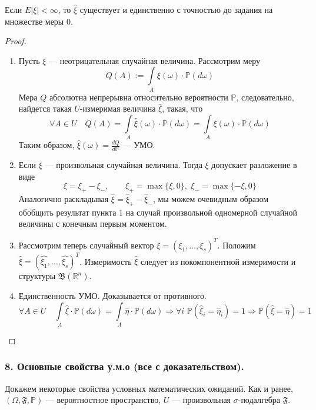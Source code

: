 \documentclass[12pt, russian]{article}
\begin{document}
\begin{theorem}
Если $E|\xi| < \infty$, то $\hat{\xi}$ существует и единственно с точностью до задания на множестве меры 0.
\end{theorem}
\begin{proof}
$ $
\begin{enumerate}
\item Пусть $\xi$ --- неотрицательная случайная величина. Рассмотрим меру 
$$ Q(A) := \int\limits_A{\xi(\omega)\cdot\mathbb{P}(d\omega)}$$
Мера $Q$ абсолютна непрерывна относительно вероятности $\mathbb{P}$, следовательно, найдется такая $U$-измеримая величина $\hat{\xi}$, такая, что 
$$ \forall A\in U \quad Q(A) = \int\limits_A{\hat{\xi}(\omega)\cdot\mathbb{P}(d\omega)} = \int\limits_A{\xi(\omega)\cdot\mathbb{P}(d\omega)}$$
Таким образом, $\hat{\xi}(\omega) = \frac{dQ}{d\mathbb{P}}$ --- УМО.
\item Если $\xi$ --- произвольная случайная величина. Тогда $\xi$ допускает разложение в виде 
$$ \xi = \xi_+ - \xi_-,\qquad \xi_+ = \max{\{\xi, 0\}},\,\,\xi_- = \max{\{-\xi, 0\}} $$
Аналогично раскладывая $\hat{\xi} = \hat{\xi}_+ - \hat{\xi}_-$, мы можем очевидным образом обобщить результат пункта 1 на случай произвольной одномерной случайной величины с конечным первым моментом.
\item Рассмотрим теперь случайный вектор $\xi = (\xi_1,\ldots,\xi_s)^T$. Положим $\hat{\xi} = (\hat{\xi_1},\ldots,\hat{\xi_s})^T$. Измеримость $\hat{\xi}$ следует из покомпонентной измеримости и структуры $\mathfrak{B}(\mathbb{R}^n)$.
\item Единственность УМО. Доказывается от противного.
$$ \forall A \in U \quad \int\limits_A{\hat{\xi}\cdot\mathbb{P}(d\omega)} = \int\limits_A{\hat{\eta}\cdot\mathbb{P}(d\omega)} \Longrightarrow \forall i \,\, \mathbb{P}(\hat{\xi}_i = \hat{\eta}_i) = 1 \Longrightarrow \mathbb{P}(\hat{\xi} = \hat{\eta}) = 1 $$
\end{enumerate}
\end{proof}

\newpage
\subsubsection*{8. Основные свойства у.м.о (все с доказательством).}

Докажем некоторые свойства условных математических ожиданий. Как и ранее, $(\Omega, \mathfrak{F}, \mathbb{P})$ --- вероятностное пространство, $U$ --- произвольная $\sigma$-подалгебра $\mathfrak{F}$.
\end{document}
